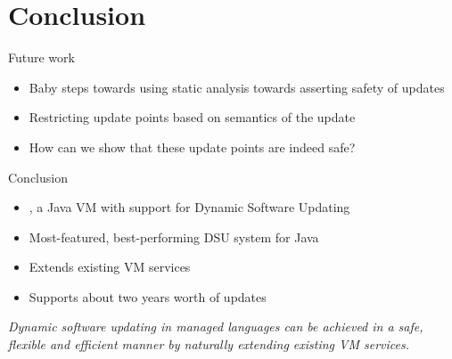
\section{Conclusion}
\ShowTOC

\begin{frame}{Future work}%
\begin{itemize}
\item Baby steps towards using static analysis towards asserting safety of
updates
\item Restricting update points based on semantics of the update
\item How can we show that these update points are indeed safe?
\end{itemize}
\end{frame}

\begin{frame}{Conclusion}%
\begin{itemize}
\item \DSU{}, a Java VM with support for Dynamic Software Updating
\item Most-featured, best-performing DSU system for Java
\item Extends existing VM services
\item Supports about two years worth of updates
\end{itemize}
\begin{block}{}
\emph{Dynamic software updating in managed languages can be achieved in a
safe, flexible and efficient manner by naturally extending existing VM
services.}
\end{block}
\end{frame}
